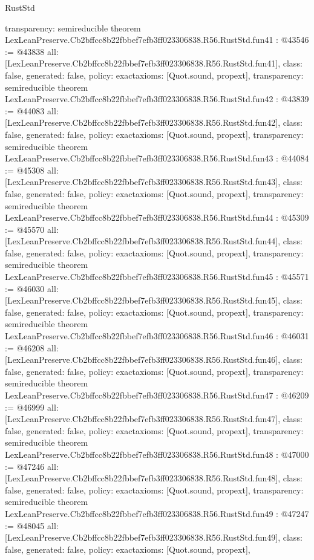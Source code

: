 \begin{lexlean}{RustStd}
\begin{coremodule}
{  transparency: semireducible
}
theorem LexLeanPreserve.Cb2bffcc8b22fbbef7efb3ff023306838.R56.RustStd.fun41 : @43546 := @43838 {
  all: [LexLeanPreserve.Cb2bffcc8b22fbbef7efb3ff023306838.R56.RustStd.fun41],
  class: false,
  generated: false,
  policy: exact{axioms: [Quot.sound, propext]},
  transparency: semireducible
}
theorem LexLeanPreserve.Cb2bffcc8b22fbbef7efb3ff023306838.R56.RustStd.fun42 : @43839 := @44083 {
  all: [LexLeanPreserve.Cb2bffcc8b22fbbef7efb3ff023306838.R56.RustStd.fun42],
  class: false,
  generated: false,
  policy: exact{axioms: [Quot.sound, propext]},
  transparency: semireducible
}
theorem LexLeanPreserve.Cb2bffcc8b22fbbef7efb3ff023306838.R56.RustStd.fun43 : @44084 := @45308 {
  all: [LexLeanPreserve.Cb2bffcc8b22fbbef7efb3ff023306838.R56.RustStd.fun43],
  class: false,
  generated: false,
  policy: exact{axioms: [Quot.sound, propext]},
  transparency: semireducible
}
theorem LexLeanPreserve.Cb2bffcc8b22fbbef7efb3ff023306838.R56.RustStd.fun44 : @45309 := @45570 {
  all: [LexLeanPreserve.Cb2bffcc8b22fbbef7efb3ff023306838.R56.RustStd.fun44],
  class: false,
  generated: false,
  policy: exact{axioms: [Quot.sound, propext]},
  transparency: semireducible
}
theorem LexLeanPreserve.Cb2bffcc8b22fbbef7efb3ff023306838.R56.RustStd.fun45 : @45571 := @46030 {
  all: [LexLeanPreserve.Cb2bffcc8b22fbbef7efb3ff023306838.R56.RustStd.fun45],
  class: false,
  generated: false,
  policy: exact{axioms: [Quot.sound, propext]},
  transparency: semireducible
}
theorem LexLeanPreserve.Cb2bffcc8b22fbbef7efb3ff023306838.R56.RustStd.fun46 : @46031 := @46208 {
  all: [LexLeanPreserve.Cb2bffcc8b22fbbef7efb3ff023306838.R56.RustStd.fun46],
  class: false,
  generated: false,
  policy: exact{axioms: [Quot.sound, propext]},
  transparency: semireducible
}
theorem LexLeanPreserve.Cb2bffcc8b22fbbef7efb3ff023306838.R56.RustStd.fun47 : @46209 := @46999 {
  all: [LexLeanPreserve.Cb2bffcc8b22fbbef7efb3ff023306838.R56.RustStd.fun47],
  class: false,
  generated: false,
  policy: exact{axioms: [Quot.sound, propext]},
  transparency: semireducible
}
theorem LexLeanPreserve.Cb2bffcc8b22fbbef7efb3ff023306838.R56.RustStd.fun48 : @47000 := @47246 {
  all: [LexLeanPreserve.Cb2bffcc8b22fbbef7efb3ff023306838.R56.RustStd.fun48],
  class: false,
  generated: false,
  policy: exact{axioms: [Quot.sound, propext]},
  transparency: semireducible
}
theorem LexLeanPreserve.Cb2bffcc8b22fbbef7efb3ff023306838.R56.RustStd.fun49 : @47247 := @48045 {
  all: [LexLeanPreserve.Cb2bffcc8b22fbbef7efb3ff023306838.R56.RustStd.fun49],
  class: false,
  generated: false,
  policy: exact{axioms: [Quot.sound, propext]},
}
\end{coremodule}
\end{lexlean}
